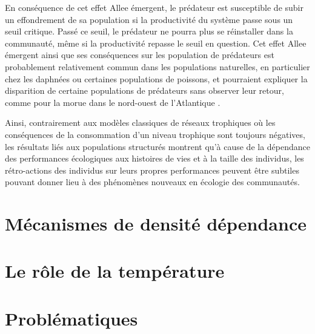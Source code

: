 En conséquence de cet effet Allee émergent, le prédateur est susceptible de
subir un effondrement de sa population si la productivité du système passe sous
un seuil critique. Passé ce seuil, le prédateur ne pourra plus se réinstaller
dans la communauté, même si la productivité repasse le seuil en question. 
Cet effet Allee émergent ainsi que ses conséquences sur les population de
prédateurs est probablement relativement commun dans les populations naturelles,
en particulier chez les daphnées \autocite{mccauley1987a} ou certaines
populations de poissons, et pourraient expliquer la disparition de certaine
populations de prédateurs sans observer leur retour, comme pour la morue dans le
nord-ouest de l'Atlantique \autocite{carscadden2001a}.

Ainsi, contrairement aux modèles classiques de réseaux  trophiques où les
conséquences de la consommation d'un niveau trophique sont toujours négatives,
les résultats liés aux populations structurés montrent qu'à cause de la
dépendance des performances écologiques aux histoires de vies et à la taille des
individus, les rétro-actions des individus sur leurs propres performances
peuvent être subtiles pouvant donner lieu à des phénomènes nouveaux en écologie
des communautés. 



\section{Mécanismes de densité dépendance}

\section{Le rôle de la température}

\section{Problématiques}	
